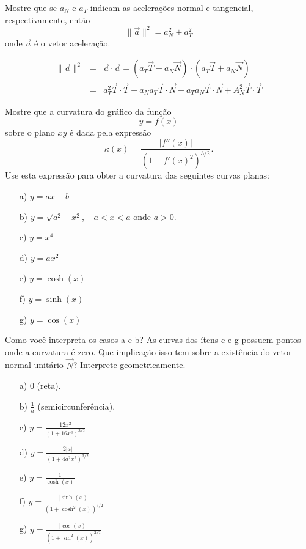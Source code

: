 \begin{exer} Mostre que se $a_N$ e $a_T$ indicam as acelerações normal e tangencial, respectivamente, então
$$\|\vec{a}\|^2=a_N^2+a_T^2$$
onde $\vec{a}$ é o vetor aceleração.
\end{exer}
\begin{resp}
 \begin{eqnarray}
\|\vec{a}\|^2&=&\vec{a}\cdot\vec{a}=\left(a_T\vec{T}+a_N\vec{N}\right)\cdot\left(a_T\vec{T}+a_N\vec{N}\right)\\
&=&a_T^2\vec{T}\cdot\vec{T}+a_Na_T\vec{T}\cdot\vec{N}+a_Ta_N\vec{T}\cdot\vec{N}+A_N^2\vec{T}\cdot\vec{T}  
 \end{eqnarray}
\end{resp}


\begin{exer} Mostre que a curvatura do gráfico da função
$$y=f(x)$$
sobre o plano $xy$
é dada pela expressão
$$\kappa(x)=\frac{|f''(x)|}{\left(1+f'(x)^2\right)^{3/2}}.$$
Use esta expressão para obter a curvatura das seguintes curvas planas:
\begin{itemize}
\item[a)] $y=ax+b$
\item[b)]$y=\sqrt{a^2-x^2}$, $-a<x<a$ onde $a>0$.
\item[c)] $y=x^4$
\item[d)] $y=ax^2$ 
\item[e)] $y=\cosh(x)$
\item[f)] $y=\sinh(x)$
\item[g)] $y=\cos(x)$
\end{itemize}
Como você interpreta os casos a e b? As curvas dos ítens c e g possuem pontos onde a curvatura é zero. Que implicação isso tem sobre a existência do vetor normal unitário $\vec{N}$? Interprete geometricamente.
\end{exer}
\begin{resp}
\begin{itemize}
\item[a)] $0$ (reta).
\item[b)]$\frac{1}{a}$ (semicircunferência).
\item[c)] $y=\frac{12x^2}{(1+16x^6)^{3/2}}$
\item[d)] $y=\frac{2|a|}{(1+4a^2x^2)^{3/2}}$
\item[e)] $y=\frac{1}{\cosh(x)}$
\item[f)] $y=\frac{|\sinh(x)|}{(1+\cosh^2(x))^{3/2}}$
\item[g)] $y=\frac{|\cos(x)|}{(1+\sin^2(x))^{3/2}}$
\end{itemize}
 \end{resp}

